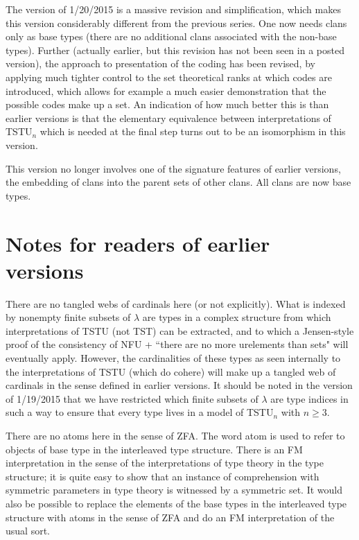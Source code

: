 \documentclass{article}
\begin{document}
 The version of 1/20/2015 is a massive revision and simplification, which makes this version considerably different from the previous series.
One now needs clans only as base types (there are no additional clans associated with the non-base types).  Further (actually earlier, but this revision has not been seen in a posted version), the approach to presentation of the coding has been revised, by applying much tighter control to the set theoretical ranks at which codes are introduced, which allows for example a much easier demonstration that the possible codes make up a set.   An indication of how much better this is than earlier versions is that the elementary equivalence between interpretations of TSTU$_n$ which is needed at the final step turns out to be an isomorphism in this version.

This version no longer involves one of the signature features of earlier versions, the embedding of clans into the parent sets of other clans.   All clans are now base types.

\newpage

\tableofcontents

\newpage

\section{Notes for readers of earlier versions}

There are no tangled webs of cardinals here (or not explicitly).  What is indexed by nonempty finite subsets of $\lambda$ are types in a complex structure from which interpretations of TSTU (not TST) can be extracted, and to which a Jensen-style proof of the consistency of NFU + ``there are no more urelements than sets" will eventually apply.   However, the cardinalities
of these types as seen internally to the interpretations of TSTU (which do cohere) will make up a tangled web of cardinals in the sense defined in earlier versions.  It should be noted in the version of 1/19/2015 that we have restricted which finite subsets of $\lambda$ are type indices in such a way to ensure that every type lives in a model of TSTU$_n$ with $n \geq 3$.

There are no atoms here in the sense of ZFA.  The word atom is used to refer to objects of base type in the interleaved type structure.   There is an FM interpretation in the sense of the interpretations
of type theory in the type structure; it is quite easy to show that an instance of comprehension with symmetric parameters in type theory is witnessed by a symmetric set.   It would also be possible to replace the elements of the base types in the interleaved type structure with atoms in the sense of ZFA and do an FM interpretation of the usual sort.
\end{document}
